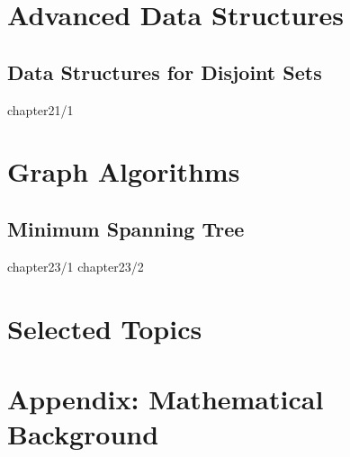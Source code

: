 \documentclass [11pt]{book}
\begin{document}

\part {Advanced Data Structures}

\chapter {Data Structures for Disjoint Sets}

 {chapter21/1}


\part {Graph Algorithms}

\chapter {Minimum Spanning Tree}

 {chapter23/1}
 {chapter23/2}


\part {Selected Topics}


\part {Appendix: Mathematical Background}
\end{document}
